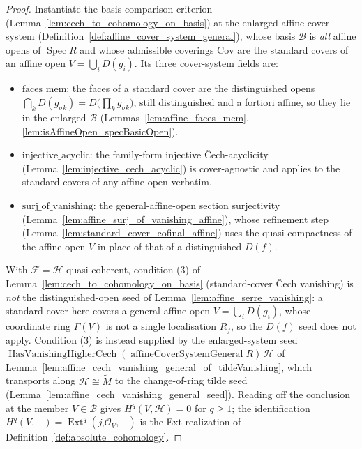\begin{proof}
    \leanok
  Instantiate the basis-comparison criterion (Lemma~\ref{lem:cech_to_cohomology_on_basis}) at the
  enlarged affine cover system (Definition~\ref{def:affine_cover_system_general}), whose basis
  \(\mathcal{B}\) is \emph{all} affine opens of \(\operatorname{Spec} R\) and whose admissible coverings
  \(\mathrm{Cov}\) are the standard covers of an affine open \(V = \bigcup_i D(g_i)\). Its three
  cover-system fields are:
  \begin{itemize}
    \item \(\mathrm{faces\_mem}\): the faces of a standard cover are the distinguished opens
      \(\bigcap_k D(g_{\sigma k}) = D\bigl(\prod_k g_{\sigma k}\bigr)\), still distinguished and a
      fortiori affine, so they lie in the enlarged \(\mathcal{B}\) (Lemmas~\ref{lem:affine_faces_mem},
      \ref{lem:isAffineOpen_specBasicOpen}).
    \item \(\mathrm{injective\_acyclic}\): the family-form injective {\v C}ech-acyclicity
      (Lemma~\ref{lem:injective_cech_acyclic}) is cover-agnostic and applies to the standard covers of
      any affine open verbatim.
    \item \(\mathrm{surj\_of\_vanishing}\): the general-affine-open section surjectivity
      (Lemma~\ref{lem:affine_surj_of_vanishing_affine}), whose refinement step
      (Lemma~\ref{lem:standard_cover_cofinal_affine}) uses the quasi-compactness of the affine open
      \(V\) in place of that of a distinguished \(D(f)\).
  \end{itemize}
  With \(\mathcal{F} = \mathcal{H}\) quasi-coherent, condition (3) of
  Lemma~\ref{lem:cech_to_cohomology_on_basis} (standard-cover {\v C}ech vanishing) is \emph{not} the
  distinguished-open seed of Lemma~\ref{lem:affine_serre_vanishing}: a standard cover here covers a
  general affine open \(V = \bigcup_i D(g_i)\), whose coordinate ring \(\Gamma(V)\) is not a single
  localisation \(R_f\), so the \(D(f)\) seed does not apply. Condition (3) is instead supplied by the
  enlarged-system seed \(\operatorname{HasVanishingHigherCech}(\operatorname{affineCoverSystemGeneral}
  R)\, \mathcal{H}\) of Lemma~\ref{lem:affine_cech_vanishing_general_of_tildeVanishing}, which transports
  along \(\mathcal{H} \cong \widetilde{M}\) to the change-of-ring tilde seed
  (Lemma~\ref{lem:affine_cech_vanishing_general_seed}). Reading off the conclusion at the member
  \(V \in \mathcal{B}\) gives \(H^q(V, \mathcal{H}) = 0\) for \(q \geq 1\); the identification
  \(H^q(V, -) = \operatorname{Ext}^q(j_!\mathcal{O}_V, -)\) is the Ext realization of
  Definition~\ref{def:absolute_cohomology}.
\end{proof}

